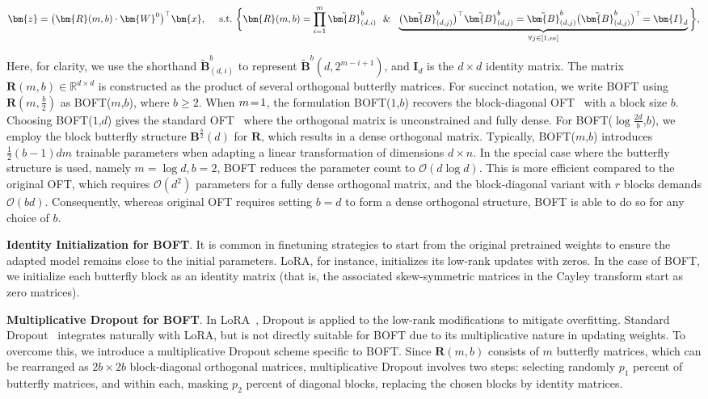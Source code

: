\begin{equation}
    \begin{aligned}\nonumber
    \bm{z}=\big(\bm{R}(m,b)\cdot\bm{W}^0\big)^\top\bm{x},~~~~\text{s.t.}~\bigg{\{}\bm{R}(m,b)=\prod_{i=1}^m \tilde{\bm{B}}^b_{(d,i)}~~\&~~\underbrace{\big(\tilde{\bm{B}}^b_{(d,j)}\big)^\top\tilde{\bm{B}}^b_{(d,j)}=\tilde{\bm{B}}^b_{(d,j)}\big(\tilde{\bm{B}}^b_{(d,j)}\big)^\top\!=\bm{I}_d}_{\forall j\in [1, m]}\bigg{\}},
    \end{aligned}
\end{equation}

Here, for clarity, we use the shorthand $\tilde{\bm{B}}^b_{(d,i)}$ to represent $\tilde{\bm{B}}^b(d,2^{m-i+1})$, and $\bm{I}_d$ is the $d \times d$ identity matrix. The matrix $\bm{R}(m,b)\in\mathbb{R}^{d\times d}$ is constructed as the product of several orthogonal butterfly matrices. For succinct notation, we write BOFT using $\bm{R}(m,\frac{b}{2})$ as BOFT($m$,$b$), where $b\geq2$. When $\thickmuskip=2mu \medmuskip=2mu m=1$, the formulation BOFT($1$,$b$) recovers the block-diagonal OFT~\cite{qiu2023controlling} with a block size $b$. Choosing BOFT($1$,$d$) gives the standard OFT~\cite{qiu2023controlling} where the orthogonal matrix is unconstrained and fully dense. For BOFT($\log \frac{2d}{b}$,$b$), we employ the block butterfly structure $\bm{B}^{\frac{b}{2}}(d)$ for $\bm{R}$, which results in a dense orthogonal matrix. Typically, BOFT($m$,$b$) introduces $\frac{1}{2}(b-1)dm$ trainable parameters when adapting a linear transformation of dimensions $d \times n$. In the special case where the butterfly structure is used, namely $m=\log d, b=2$, BOFT reduces the parameter count to $\mathcal{O}(d\log d)$. This is more efficient compared to the original OFT, which requires $\mathcal{O}(d^2)$ parameters for a fully dense orthogonal matrix, and the block-diagonal variant with $r$ blocks demands $\mathcal{O}(bd)$. Consequently, whereas original OFT requires setting $b=d$ to form a dense orthogonal structure, BOFT is able to do so for any choice of $b$.

\textbf{Identity Initialization for BOFT}. It is common in finetuning strategies to start from the original pretrained weights to ensure the adapted model remains close to the initial parameters. LoRA, for instance, initializes its low-rank updates with zeros. In the case of BOFT, we initialize each butterfly block as an identity matrix (that is, the associated skew-symmetric matrices in the Cayley transform start as zero matrices).

\textbf{Multiplicative Dropout for BOFT}. In LoRA~\cite{hulora2022}, Dropout is applied to the low-rank modifications to mitigate overfitting. Standard Dropout~\cite{srivastava2014dropout} integrates naturally with LoRA, but is not directly suitable for BOFT due to its multiplicative nature in updating weights. To overcome this, we introduce a multiplicative Dropout scheme specific to BOFT. Since $\bm{R}(m,b)$ consists of $m$ butterfly matrices, which can be rearranged as $2b\times 2b$ block-diagonal orthogonal matrices, multiplicative Dropout involves two steps: selecting randomly $p_1$ percent of butterfly matrices, and within each, masking $p_2$ percent of diagonal blocks, replacing the chosen blocks by identity matrices.

